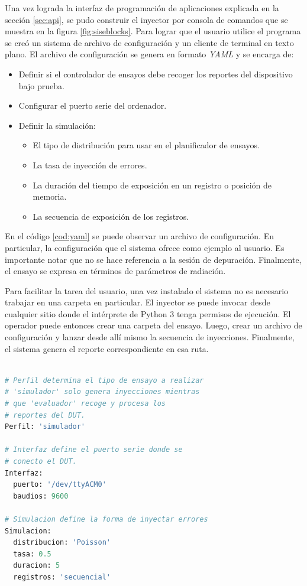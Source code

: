 Una vez lograda la interfaz de programación de aplicaciones explicada en la sección \ref{sec:api}, se pudo construir el inyector por consola de comandos que se muestra en la figura \ref{fig:siseblocks}.
Para lograr que el usuario utilice el programa se creó un sistema de archivo de configuración y un cliente de terminal en texto plano.
El archivo de configuración se genera en formato \emph{YAML} y se encarga de:

\begin{itemize}
    \item Definir si el controlador de ensayos debe recoger los reportes del dispositivo bajo prueba.
    \item Configurar el puerto serie del ordenador.
    \item Definir la simulación:
        \begin{itemize}
            \item El tipo de distribución para usar en el planificador de ensayos.
            \item La tasa de inyección de errores.
            \item La duración del tiempo de exposición en un registro o posición de memoria.
            \item La secuencia de exposición de los registros.
        \end{itemize}
\end{itemize}


En el código \ref{cod:yaml} se puede observar un archivo de configuración.
En particular, la configuración que el sistema ofrece como ejemplo al usuario.
Es importante notar que no se hace referencia a la sesión de depuración.
Finalmente, el ensayo se expresa en términos de parámetros de radiación.

Para facilitar la tarea del usuario, una vez instalado el sistema no es necesario trabajar en una carpeta en particular.
El inyector se puede invocar desde cualquier sitio donde el intérprete de Python 3 tenga permisos de ejecución.
El operador puede entonces crear una carpeta del ensayo.
Luego, crear un archivo de configuración y lanzar desde allí mismo la secuencia de inyecciones.
Finalmente, el sistema genera el reporte correspondiente en esa ruta.

\begin{lstlisting}[language=Python,label=cod:yaml,caption=Ejemplo de configuración de ensayo.]  % Start your code-block

# Perfil determina el tipo de ensayo a realizar
# 'simulador' solo genera inyecciones mientras
# que 'evaluador' recoge y procesa los
# reportes del DUT.
Perfil: 'simulador'

# Interfaz define el puerto serie donde se
# conecto el DUT.
Interfaz:
  puerto: '/dev/ttyACM0'
  baudios: 9600

# Simulacion define la forma de inyectar errores
Simulacion:
  distribucion: 'Poisson'
  tasa: 0.5
  duracion: 5
  registros: 'secuencial'

\end{lstlisting}

